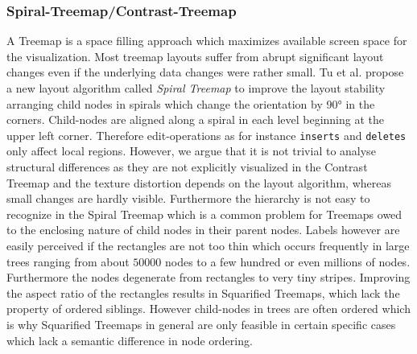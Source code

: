 \subsubsection{Spiral-Treemap/Contrast-Treemap\cite{tu2007visualizing}}
A Treemap is a space filling approach which maximizes available screen space for the visualization. Most treemap layouts suffer from abrupt significant layout changes even if the underlying data changes were rather small. Tu et al. propose a new layout algorithm called \emph{Spiral Treemap} to improve the layout stability arranging child nodes in spirals which change the orientation by 90° in the corners. Child-nodes are aligned along a spiral in each level beginning at the upper left corner. Therefore edit-operations as for instance \texttt{inserts} and \texttt{deletes} only affect local regions. However, we argue that it is not trivial to analyse structural differences as they are not explicitly visualized in the Contrast Treemap and the texture distortion depends on the layout algorithm, whereas small changes are hardly visible. Furthermore the hierarchy is not easy to recognize in the Spiral Treemap which is a common problem for Treemaps owed to the enclosing nature of child nodes in their parent nodes. Labels however are easily perceived if the rectangles are not too thin which occurs frequently in large trees ranging from about $50000$ nodes to a few hundred or even millions of nodes. Furthermore the nodes degenerate from rectangles to very tiny stripes. Improving the aspect ratio of the rectangles results in Squarified Treemaps\cite{bruls2000squarified}, which lack the property of ordered siblings. However child-nodes in trees are often ordered which is why Squarified Treemaps in general are only feasible in certain specific cases which lack a semantic difference in node ordering. %

